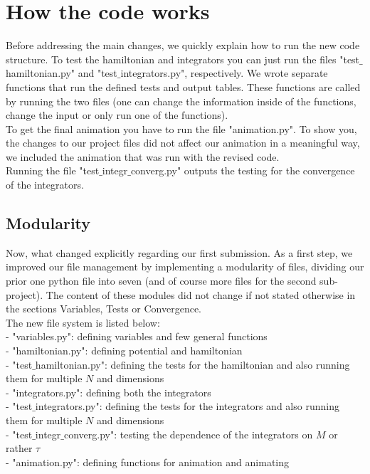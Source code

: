 \documentclass[11pt, letterpaper, onecolumn]{article}
\begin{document}
		\newpage
	
	
	
	
	
	
	\tableofcontents
	
	
	
	
	
	\vspace{0.5cm}
	
	
	\section{How the code works}
	Before addressing the main changes, we quickly explain how to run the new code structure. To test the hamiltonian and integrators you can just run the files "test$\_$hamiltonian.py" and "test$\_$integrators.py", respectively. We wrote separate functions that run the defined tests and output tables. These functions are called by running the two files (one can change the information inside of the functions, change the input or only run one of the functions).\\
	To get the final animation you have to run the file "animation.py". To show you, the changes to our project files did not affect our animation in a meaningful way, we included the animation that was run with the revised code. \\ 
	Running the file "test$\_$integr$\_$converg.py" outputs the testing for the convergence of the integrators.
	
	
	\subsection{Modularity}
	Now, what changed explicitly regarding our first submission. As a first step, we improved our file management by implementing a modularity of files, dividing our prior one python file into seven (and of course more files for the second sub-project). The content of these modules did not change if not stated otherwise in the sections Variables, Tests or Convergence. \\
	The new file system is listed below: \\ 
	- "variables.py": defining variables and few general functions\\
	- "hamiltonian.py": defining potential and hamiltonian\\
	- "test$\_$hamiltonian.py": defining the tests for the hamiltonian and also running them for multiple $N$ and dimensions \\
	- "integrators.py": defining both the integrators \\
	- "test$\_$integrators.py": defining the tests for the integrators and also running them for multiple $N$ and dimensions \\
	- "test$\_$integr$\_$converg.py": testing the dependence of the integrators on $M$ or rather $\tau$ \\
	- "animation.py": defining functions for animation and animating
\end{document}

